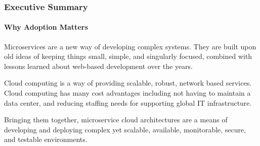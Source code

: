 \begin{frame}
  \frametitle{Executive Summary}
  \framesubtitle{Why Adoption Matters}

  Microservices are a new way of developing complex systems. They are built upon old ideas of keeping things small, simple, and singularly focused, combined with lessons learned about web-based development over the years.

  Cloud computing is a way of providing scalable, robust, network based services. Cloud computing has many cost advantages including not having to maintain a data center, and reducing staffing needs for supporting global IT infrastructure.

  Bringing them together, microservice cloud architectures are a means of developing and deploying complex yet scalable, available, monitorable, secure, and testable environments.

\end{frame}
